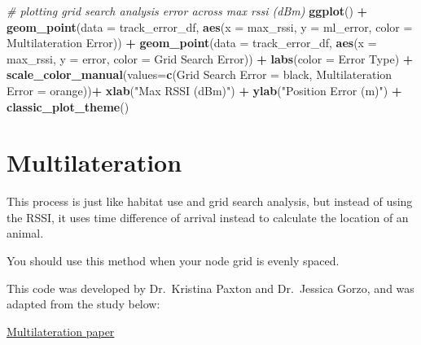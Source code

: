\documentclass[
]{book}
\newenvironment{Shaded}{\begin{snugshade}}{\end{snugshade}}
\newcommand{\AttributeTok}[1]{\textcolor[rgb]{0.13,0.29,0.53}{#1}}
\newcommand{\CommentTok}[1]{\textcolor[rgb]{0.56,0.35,0.01}{\textit{#1}}}
\newcommand{\FunctionTok}[1]{\textcolor[rgb]{0.13,0.29,0.53}{\textbf{#1}}}
\newcommand{\NormalTok}[1]{#1}
\newcommand{\OtherTok}[1]{\textcolor[rgb]{0.56,0.35,0.01}{#1}}
\newcommand{\SpecialCharTok}[1]{\textcolor[rgb]{0.81,0.36,0.00}{\textbf{#1}}}
\newcommand{\StringTok}[1]{\textcolor[rgb]{0.31,0.60,0.02}{#1}}
\begin{document}
\begin{Shaded}
\begin{Highlighting}[]
\CommentTok{\# plotting grid search analysis error across max rssi (dBm)}
\FunctionTok{ggplot}\NormalTok{() }\SpecialCharTok{+}
  \FunctionTok{geom\_point}\NormalTok{(}\AttributeTok{data =}\NormalTok{ track\_error\_df, }
             \FunctionTok{aes}\NormalTok{(}\AttributeTok{x =}\NormalTok{ max\_rssi, }
                 \AttributeTok{y =}\NormalTok{ ml\_error,}
                 \AttributeTok{color =} \StringTok{\textquotesingle{}Multilateration Error\textquotesingle{}}\NormalTok{)) }\SpecialCharTok{+}
  \FunctionTok{geom\_point}\NormalTok{(}\AttributeTok{data =}\NormalTok{ track\_error\_df, }
             \FunctionTok{aes}\NormalTok{(}\AttributeTok{x =}\NormalTok{ max\_rssi, }
                 \AttributeTok{y =}\NormalTok{ error,}
                 \AttributeTok{color =} \StringTok{\textquotesingle{}Grid Search Error\textquotesingle{}}\NormalTok{)) }\SpecialCharTok{+}
  \FunctionTok{labs}\NormalTok{(}\AttributeTok{color =} \StringTok{\textquotesingle{}Error Type\textquotesingle{}}\NormalTok{) }\SpecialCharTok{+}
  \FunctionTok{scale\_color\_manual}\NormalTok{(}\AttributeTok{values=}\FunctionTok{c}\NormalTok{(}\StringTok{\textquotesingle{}Grid Search Error\textquotesingle{}} \OtherTok{=} \StringTok{\textquotesingle{}black\textquotesingle{}}\NormalTok{,}
                              \StringTok{\textquotesingle{}Multilateration Error\textquotesingle{}} \OtherTok{=} \StringTok{\textquotesingle{}orange\textquotesingle{}}\NormalTok{))}\SpecialCharTok{+}
  \FunctionTok{xlab}\NormalTok{(}\StringTok{"Max RSSI (dBm)"}\NormalTok{) }\SpecialCharTok{+}
  \FunctionTok{ylab}\NormalTok{(}\StringTok{"Position Error (m)"}\NormalTok{) }\SpecialCharTok{+}
  \FunctionTok{classic\_plot\_theme}\NormalTok{()}
\end{Highlighting}
\end{Shaded}

\chapter{Multilateration}\label{multilateration}

This process is just like habitat use and grid search analysis, but instead of using the RSSI, it uses time difference of arrival instead to calculate the location of an animal.

You should use this method when your node grid is evenly spaced.

This code was developed by Dr.~Kristina Paxton and Dr.~Jessica Gorzo, and was adapted from the study below:

\href{https://pubmed.ncbi.nlm.nih.gov/35169450/}{Multilateration paper}
\end{document}
